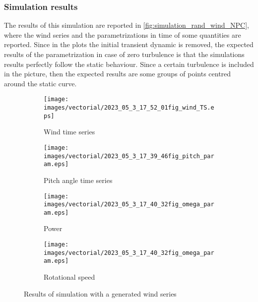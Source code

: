 \subsubsection{Simulation results}
The results of this simulation are reported in \autoref{fig:simulation_rand_wind_NPC}, where the wind series and the parametrizations in time of some quantities are reported. Since in the plots the initial transient dynamic is removed, the expected results of the parametrization in case of zero turbulence is that the simulations results perfectly follow the static behaviour. Since a certain turbulence is included in the picture, then the expected results are some groups of points centred around the static curve.
\begin{figure}[htb]
  \begin{subfigure}{0.5\columnwidth}
    \centering
    \texttt{[image: images/vectorial/2023\_05\_3\_17\_52\_01fig\_wind\_TS.eps]}
    \caption{Wind time series}
    \label{fig:2023_05_1_00_55_48fig_wind_TS.eps}
  \end{subfigure}
  \begin{subfigure}{0.5\columnwidth}
    \centering
    \texttt{[image: images/vectorial/2023\_05\_3\_17\_39\_46fig\_pitch\_param.eps]}
    \caption{Pitch angle time series}
    \label{fig:2023_05_1_00_50_19fig_power_param}
  \end{subfigure}
  \begin{subfigure}{0.5\columnwidth}
    \centering
    \texttt{[image: images/vectorial/2023\_05\_3\_17\_40\_32fig\_omega\_param.eps]}
    \caption{Power}
    \label{fig:2023_05_1_00_51_17fig_omega_param}
  \end{subfigure}
  \begin{subfigure}{0.5\columnwidth}
    \centering
    \texttt{[image: images/vectorial/2023\_05\_3\_17\_40\_32fig\_omega\_param.eps]}
    \caption{Rotational speed}
    \label{fig:2023_05_1_00_50_58fig_pitch_param}
  \end{subfigure}
  \caption{Results of simulation with a generated wind series}
  \label{fig:simulation_rand_wind_NPC}
\end{figure}


